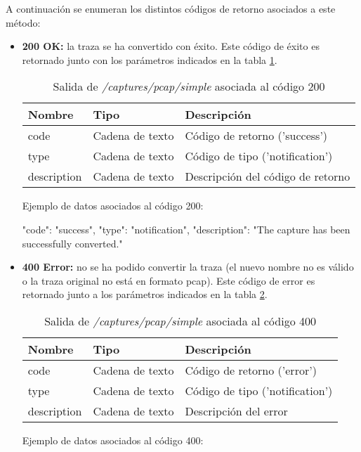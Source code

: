 A continuación se enumeran los distintos códigos de retorno asociados a este método:
\begin{itemize}

\item{\textbf{200 OK:} la \gls{traza} se ha convertido con éxito. Este código de éxito es retornado junto con los parámetros indicados en la tabla \ref{extra:api:capturespcapsimple:ok}.
\begin{table}[H]
\centering
\begin{tabular}{|l|l|l|}
\hline
\rowcolor[HTML]{F5F5F5}
\textbf{Nombre}  & \textbf{Tipo}   & \textbf{Descripción}              \\ \hline
code             & Cadena de texto & Código de retorno ('success')     \\ \hline
type             & Cadena de texto & Código de tipo ('notification')   \\ \hline
description      & Cadena de texto & Descripción del código de retorno \\ \hline
\end{tabular}
\caption{Salida de \textit{/captures/pcap/simple} asociada al código 200}
\label{extra:api:capturespcapsimple:ok}
\end{table}
\begin{minipage}{\textwidth}
Ejemplo de datos asociados al código 200:

\begin{code}[language=json]
{
  "code": "success",
  "type": "notification",
  "description": "The capture has been successfully converted."
}
\end{code}
\end{minipage}
}

\item{\textbf{400 Error:} no se ha podido convertir la \gls{traza} (el nuevo nombre no es válido o la \gls{traza} original no está en formato \gls{pcap}). Este código de error es retornado junto a los parámetros indicados en la tabla \ref{extra:api:capturespcapsimple:error}.
\begin{table}[H]
\centering
\begin{tabular}{|l|l|l|}
\hline
\rowcolor[HTML]{F5F5F5}
\textbf{Nombre}  & \textbf{Tipo}   & \textbf{Descripción}            \\ \hline
code             & Cadena de texto & Código de retorno ('error')     \\ \hline
type             & Cadena de texto & Código de tipo ('notification') \\ \hline
description      & Cadena de texto & Descripción del error           \\ \hline
\end{tabular}
\caption{Salida de \textit{/captures/pcap/simple} asociada al código 400}
\label{extra:api:capturespcapsimple:error}
\end{table}
\begin{minipage}{\textwidth}
Ejemplo de datos asociados al código 400:


\end{minipage}}
\end{itemize}
